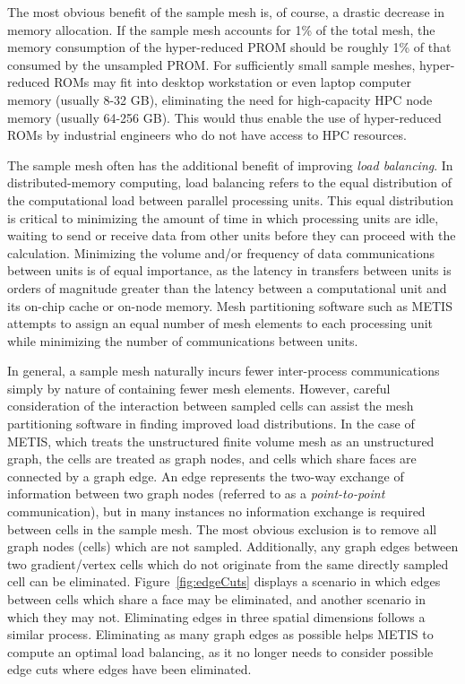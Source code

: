 The most obvious benefit of the sample mesh is, of course, a drastic decrease in memory allocation. If the sample mesh accounts for 1\% of the total mesh, the memory consumption of the hyper-reduced PROM should be roughly 1\% of that consumed by the unsampled PROM. For sufficiently small sample meshes, hyper-reduced ROMs may fit into desktop workstation or even laptop computer memory (usually 8-32 GB), eliminating the need for high-capacity HPC node memory (usually 64-256 GB). This would thus enable the use of hyper-reduced ROMs by industrial engineers who do not have access to HPC resources.

The sample mesh often has the additional benefit of improving \textit{load balancing}. In distributed-memory computing, load balancing refers to the equal distribution of the computational load between parallel processing units. This equal distribution is critical to minimizing the amount of time in which processing units are idle, waiting to send or receive data from other units before they can proceed with the calculation. Minimizing the volume and/or frequency of data communications between units is of equal importance, as the latency in transfers between units is orders of magnitude greater than the latency between a computational unit and its on-chip cache or on-node memory. Mesh partitioning software such as METIS~\cite{metis} attempts to assign an equal number of mesh elements to each processing unit while minimizing the number of communications between units.

In general, a sample mesh naturally incurs fewer inter-process communications simply by nature of containing fewer mesh elements. However, careful consideration of the interaction between sampled cells can assist the mesh partitioning software in finding improved load distributions. In the case of METIS, which treats the unstructured finite volume mesh as an unstructured graph, the cells are treated as graph nodes, and cells which share faces are connected by a graph edge. An edge represents the two-way exchange of information between two graph nodes (referred to as a \textit{point-to-point} communication), but in many instances no information exchange is required between cells in the sample mesh. The most obvious exclusion is to remove all graph nodes (cells) which are not sampled. Additionally, any graph edges between two gradient/vertex cells which do not originate from the same directly sampled cell can be eliminated. Figure~\ref{fig:edgeCuts} displays a scenario in which edges between cells which share a face may be eliminated, and another scenario in which they may not. Eliminating edges in three spatial dimensions follows a similar process. Eliminating as many graph edges as possible helps METIS to compute an optimal load balancing, as it no longer needs to consider possible edge cuts where edges have been eliminated.

